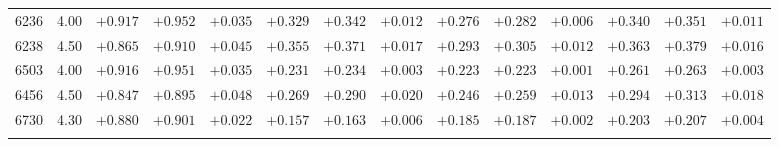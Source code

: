 \documentclass[]{aa}
\begin{document}
\begin{appendix}
\begin{table*}
\begin{center}
\begin{tabular}{llllllllllllll}
6236  &4.00 & $+0.917$ & $+0.952$ & $+0.035$ & $+0.329$ & $+0.342$ & $+0.012$ & $+0.276$ & $+0.282$ & $+0.006$ & $+0.340$ & $+0.351$ & $+0.011$ \\
6238  &4.50 & $+0.865$ & $+0.910$ & $+0.045$ & $+0.355$ & $+0.371$ & $+0.017$ & $+0.293$ & $+0.305$ & $+0.012$ & $+0.363$ & $+0.379$ & $+0.016$ \\
6503  &4.00 & $+0.916$ & $+0.951$ & $+0.035$ & $+0.231$ & $+0.234$ & $+0.003$ & $+0.223$ & $+0.223$ & $+0.001$ & $+0.261$ & $+0.263$ & $+0.003$ \\
6456  &4.50 & $+0.847$ & $+0.895$ & $+0.048$ & $+0.269$ & $+0.290$ & $+0.020$ & $+0.246$ & $+0.259$ & $+0.013$ & $+0.294$ & $+0.313$ & $+0.018$ \\
6730  &4.30 & $+0.880$ & $+0.901$ & $+0.022$ & $+0.157$ & $+0.163$ & $+0.006$ & $+0.185$ & $+0.187$ & $+0.002$ & $+0.203$ & $+0.207$ & $+0.004$ \\
\hline\noalign{\smallskip}
\hline\noalign{\smallskip}
\end{tabular}
\end{center}
\end{table*}



\end{appendix}
\end{document}
